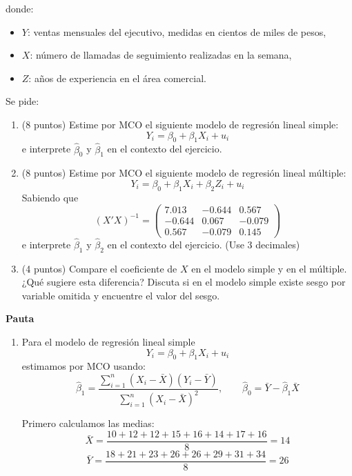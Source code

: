 \documentclass[10pt,a4paper]{article}
\begin{document}
\begin{enumerate}
    donde:
    \begin{itemize}
        \item \(Y\): ventas mensuales del ejecutivo, medidas en cientos de miles de pesos,
        \item \(X\): número de llamadas de seguimiento realizadas en la semana,
        \item \(Z\): años de experiencia en el área comercial.
    \end{itemize}

    Se pide:

    \begin{enumerate}
        \item (8 puntos) Estime por MCO el siguiente modelo de regresión lineal simple:
        \[
        Y_i=\beta_0+\beta_1X_i+u_i
        \]
 e interprete \(\hat{\beta}_0\) y \(\hat{\beta}_1\) en el contexto del ejercicio.

        \item (8 puntos) Estime por MCO el siguiente modelo de regresión lineal múltiple:
        \[
        Y_i=\beta_0+\beta_1X_i+\beta_2Z_i+u_i
        \]
Sabiendo que 
$$(X'X)^{-1}=
        \begin{pmatrix}
        7.013 & -0.644 & 0.567\\
        -0.644 & 0.067 & -0.079\\
        0.567 & -0.079 & 0.145
        \end{pmatrix} $$
e interprete \(\hat{\beta}_1\) y \(\hat{\beta}_2\) en el contexto del ejercicio. (Use 3 decimales)

        \item (4 puntos) Compare el coeficiente de \(X\) en el modelo simple y en el múltiple. ¿Qué sugiere esta diferencia? Discuta si en el modelo simple existe sesgo por variable omitida y encuentre el valor del sesgo.
    \end{enumerate}
\textbf{Pauta}

\begin{enumerate}
    \item Para el modelo de regresión lineal simple
    \[
    Y_i=\beta_0+\beta_1X_i+u_i
    \]
    estimamos por MCO usando:
    \[
    \hat{\beta}_1=\frac{\sum_{i=1}^n (X_i-\bar X)(Y_i-\bar Y)}{\sum_{i=1}^n (X_i-\bar X)^2},
    \qquad
    \hat{\beta}_0=\bar Y-\hat{\beta}_1\bar X
    \]

    Primero calculamos las medias:
    \[
    \bar X=\frac{10+12+12+15+16+14+17+16}{8}=14
    \]
    \[
    \bar Y=\frac{18+21+23+26+26+29+31+34}{8}=26
    \]


\end{enumerate}
\end{enumerate}
\end{document}

